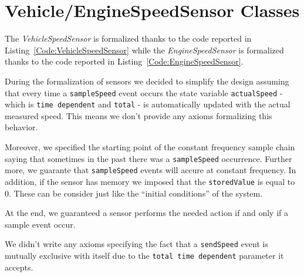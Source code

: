 \section{Vehicle/EngineSpeedSensor Classes}
\label{Section:SpeedSensors}
The \emph{VehicleSpeedSensor} is formalized thanks to the code reported in Listing~\ref{Code:VehicleSpeedSensor} while the \emph{EngineSpeedSensor} is formalized thanks to the code reported in Listing~\ref{Code:EngineSpeedSensor}.

During the formalization of sensors we decided to simplify the design assuming that every time a \texttt{sampleSpeed} event occurs the state variable \texttt{actualSpeed} - which is \texttt{time dependent} and \texttt{total} - is automatically updated with the actual measured speed. This means we don't provide any axioms formalizing this behavior.

Moreover, we specified the starting point of the constant frequency sample chain saying that sometimes in the past there was a \texttt{sampleSpeed} occurrence. Further more, we guarante that \texttt{sampleSpeed} events will accure at constant frequency. In addition, if the sensor has memory we imposed that the \texttt{storedValue} is equal to 0. These can be consider just like the ``initial conditions'' of the system.

At the end, we guaranteed a sensor performs the needed action if and only if a sample event occur.

We didn't write any axioms specifying the fact that a \texttt{sendSpeed} event is mutually exclusive with itself due to the \texttt{total time dependent} parameter it accepts.





